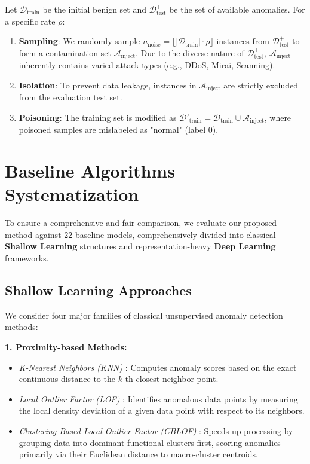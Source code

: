 \documentclass[final,twocolumn,10pt]{elsarticle}
\begin{document}
Let $\mathcal{D}_{\text{train}}$ be the initial benign set and $\mathcal{D}_{\text{test}}^{+}$ be the set of available anomalies. For a specific rate $\rho$:
\begin{enumerate}
    \item \textbf{Sampling}: We randomly sample $n_{\text{noise}} = \lfloor |\mathcal{D}_{\text{train}}| \cdot \rho \rfloor$ instances from $\mathcal{D}_{\text{test}}^{+}$ to form a contamination set $\mathcal{A}_{\text{inject}}$. Due to the diverse nature of $\mathcal{D}_{\text{test}}^{+}$, $\mathcal{A}_{\text{inject}}$ inherently contains varied attack types (e.g., DDoS, Mirai, Scanning).
    \item \textbf{Isolation}: To prevent data leakage, instances in $\mathcal{A}_{\text{inject}}$ are strictly excluded from the evaluation test set.
    \item \textbf{Poisoning}: The training set is modified as $\mathcal{D}'_{\text{train}} = \mathcal{D}_{\text{train}} \cup \mathcal{A}_{\text{inject}}$, where poisoned samples are mislabeled as "normal" (label 0). 
\end{enumerate}


\section{Baseline Algorithms Systematization}
\label{ap1:ap_baselines}

To ensure a comprehensive and fair comparison, we evaluate our proposed method against 22 baseline models, comprehensively divided into classical \textbf{Shallow Learning} structures and representation-heavy \textbf{Deep Learning} frameworks.

\subsection{Shallow Learning Approaches}
We consider four major families of classical unsupervised anomaly detection methods:

\textbf{1. Proximity-based Methods:} 
\begin{itemize}
    \item \textit{K-Nearest Neighbors (KNN)} \cite{KNN}: Computes anomaly scores based on the exact continuous distance to the $k$-th closest neighbor point.
    \item \textit{Local Outlier Factor (LOF)} \cite{LOF}: Identifies anomalous data points by measuring the local density deviation of a given data point with respect to its neighbors. 
    \item \textit{Clustering-Based Local Outlier Factor (CBLOF)} \cite{CBLOF}: Speeds up processing by grouping data into dominant functional clusters first, scoring anomalies primarily via their Euclidean distance to macro-cluster centroids.
\end{itemize}
\end{document}
